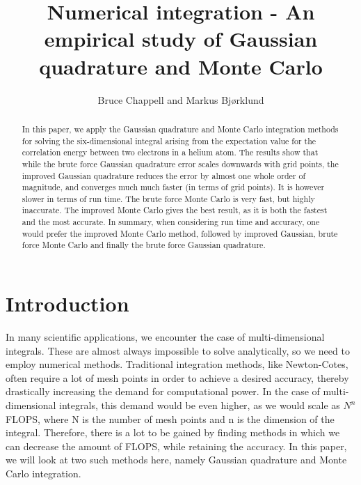 \documentclass{emulateapj}
\begin{document}
\title{Numerical integration - An empirical study of Gaussian quadrature and Monte Carlo}

\author{Bruce Chappell and Markus Bjørklund}



\begin{abstract}
In this paper, we apply the Gaussian quadrature and Monte Carlo integration methods for solving the six-dimensional integral arising from the expectation value for the correlation energy between two electrons in a helium atom. The results show that while the brute force Gaussian quadrature error scales downwards with grid points, the improved Gaussian quadrature reduces the error by almost one whole order of magnitude, and converges much much faster (in terms of grid points). It is however slower in terms of run time. The brute force Monte Carlo is very fast, but highly inaccurate. The improved Monte Carlo gives the best result, as it is both the fastest and the most accurate. In summary, when considering run time and accuracy, one would prefer the improved Monte Carlo method, followed by improved Gaussian, brute force Monte Carlo and finally the brute force Gaussian quadrature.

\end{abstract}

\section{Introduction}
\label{sec:introduction}

In many scientific applications, we encounter the case of multi-dimensional integrals. These are almost always impossible to solve analytically, so we need to employ numerical methods. Traditional integration methods, like Newton-Cotes, often require a lot of mesh points in order to achieve a desired accuracy, thereby drastically increasing the demand for computational power. In the case of multi-dimensional integrals, this demand would be even higher, as we would scale as $N^n$ FLOPS, where N is the number of mesh points and n is the dimension of the integral. Therefore, there is a lot to be gained by finding methods in which we can decrease the amount of FLOPS, while retaining the accuracy. In this paper, we will look at two such methods here, namely Gaussian quadrature and Monte Carlo integration.
\end{document}
